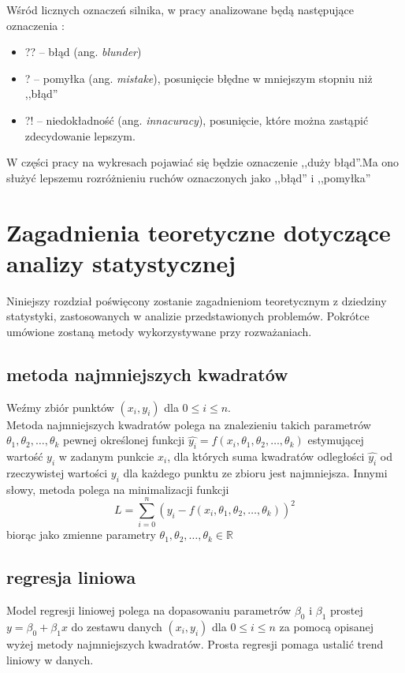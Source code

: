 \documentclass[inzynierska]{pwr_wmat_praca_dyplomowa}
\theoremstyle{plain}
\numberwithin{theorem}{chapter}
\theoremstyle{definition}
\numberwithin{theorem}{chapter}
\begin{document}
Wśród licznych oznaczeń silnika, w pracy analizowane będą następujące oznaczenia \cite{symbols}:
\begin{itemize}
	\item ??\hphantom{!} -- błąd (ang. \textit{blunder})
	\item ?\hphantom{?!}  -- pomyłka (ang. \textit{mistake}), posunięcie błędne w mniejszym stopniu niż ,,błąd''
	\item ?!\hphantom{?} -- niedokładność  (ang. \textit{innacuracy}), posunięcie, które można zastąpić zdecydowanie lepszym.
\end{itemize}
W części pracy na wykresach pojawiać się będzie oznaczenie ,,duży błąd''.Ma ono służyć lepszemu rozróżnieniu ruchów oznaczonych jako ,,błąd'' i ,,pomyłka''



\chapter{Zagadnienia teoretyczne dotyczące analizy statystycznej}\label{teoria}
Niniejszy rozdział poświęcony zostanie zagadnieniom teoretycznym z dziedziny statystyki, zastosowanych w analizie przedstawionych problemów. Pokrótce umówione zostaną metody wykorzystywane przy rozważaniach. %

\section{metoda najmniejszych kwadratów}
Weźmy zbiór punktów $(x_i, y_i)$ dla $0\leq i \leq n$.\\
Metoda najmniejszych kwadratów \cite{dekking2005modern} polega na znalezieniu takich parametrów $\theta_1, \theta_2, \dots, \theta_k$ pewnej określonej funkcji $\hat{y_i} = f\left(x_i, \theta_1, \theta_2, \dots, \theta_k \right)$ estymującej wartość $y_i$ w zadanym punkcie $x_i$, dla których suma kwadratów odległości $\hat{y_i}$ od rzeczywistej wartości $y_i$ dla każdego punktu ze zbioru jest najmniejsza. Innymi słowy, metoda polega na minimalizacji funkcji 
\begin{equation*}
	L = \sum_{i=0}^{n}(y_i-f\left(x_i, \theta_1, \theta_2, \dots, \theta_k \right))^2
\end{equation*}
biorąc jako zmienne parametry $ \theta_1, \theta_2, \dots, \theta_k \in \mathbb{R} $

\section{regresja liniowa}
Model regresji liniowej \cite[strony 265 -- 267]{statysty} polega na dopasowaniu parametrów $\beta_0$ i $\beta_1$ prostej $y=\beta_0+\beta_1 x$ do zestawu danych $(x_i, y_i)$ dla $0\leq i \leq n$ za pomocą opisanej wyżej metody najmniejszych kwadratów. Prosta regresji pomaga ustalić trend liniowy w danych.
\end{document}
